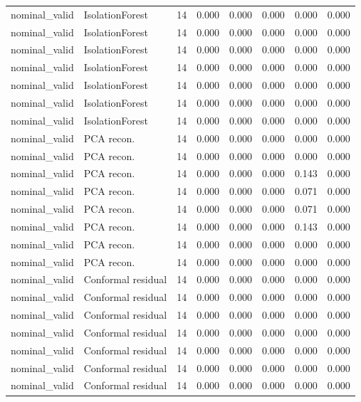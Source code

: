 {\begin{longtable}{llrrrrrr}
nominal\_valid & IsolationForest & 14 & 0.000 & 0.000 & 0.000 & 0.000 & 0.000 \\
nominal\_valid & IsolationForest & 14 & 0.000 & 0.000 & 0.000 & 0.000 & 0.000 \\
nominal\_valid & IsolationForest & 14 & 0.000 & 0.000 & 0.000 & 0.000 & 0.000 \\
nominal\_valid & IsolationForest & 14 & 0.000 & 0.000 & 0.000 & 0.000 & 0.000 \\
nominal\_valid & IsolationForest & 14 & 0.000 & 0.000 & 0.000 & 0.000 & 0.000 \\
nominal\_valid & IsolationForest & 14 & 0.000 & 0.000 & 0.000 & 0.000 & 0.000 \\
nominal\_valid & IsolationForest & 14 & 0.000 & 0.000 & 0.000 & 0.000 & 0.000 \\
nominal\_valid & PCA recon. & 14 & 0.000 & 0.000 & 0.000 & 0.000 & 0.000 \\
nominal\_valid & PCA recon. & 14 & 0.000 & 0.000 & 0.000 & 0.000 & 0.000 \\
nominal\_valid & PCA recon. & 14 & 0.000 & 0.000 & 0.000 & 0.143 & 0.000 \\
nominal\_valid & PCA recon. & 14 & 0.000 & 0.000 & 0.000 & 0.071 & 0.000 \\
nominal\_valid & PCA recon. & 14 & 0.000 & 0.000 & 0.000 & 0.071 & 0.000 \\
nominal\_valid & PCA recon. & 14 & 0.000 & 0.000 & 0.000 & 0.143 & 0.000 \\
nominal\_valid & PCA recon. & 14 & 0.000 & 0.000 & 0.000 & 0.000 & 0.000 \\
nominal\_valid & PCA recon. & 14 & 0.000 & 0.000 & 0.000 & 0.000 & 0.000 \\
nominal\_valid & Conformal residual & 14 & 0.000 & 0.000 & 0.000 & 0.000 & 0.000 \\
nominal\_valid & Conformal residual & 14 & 0.000 & 0.000 & 0.000 & 0.000 & 0.000 \\
nominal\_valid & Conformal residual & 14 & 0.000 & 0.000 & 0.000 & 0.000 & 0.000 \\
nominal\_valid & Conformal residual & 14 & 0.000 & 0.000 & 0.000 & 0.000 & 0.000 \\
nominal\_valid & Conformal residual & 14 & 0.000 & 0.000 & 0.000 & 0.000 & 0.000 \\
nominal\_valid & Conformal residual & 14 & 0.000 & 0.000 & 0.000 & 0.000 & 0.000 \\
nominal\_valid & Conformal residual & 14 & 0.000 & 0.000 & 0.000 & 0.000 & 0.000 \\

\end{longtable}}
